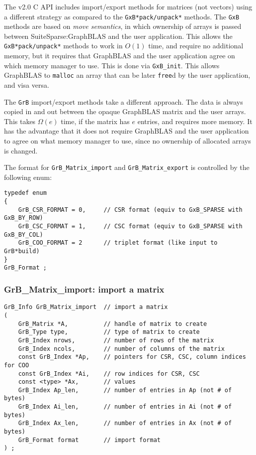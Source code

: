 \documentclass[12pt]{article}
\begin{document}
{The v2.0 C API includes import/export methods for matrices (not vectors) using
a different strategy as compared to the \verb'GxB*pack/unpack*' methods.  The
\verb'GxB' methods are based on {\em move semantics}, in which ownership of
arrays is passed between SuiteSparse:GraphBLAS and the user application.  This
allows the \verb'GxB*pack/unpack*' methods to work in $O(1)$ time, and require
no additional memory, but it requires that GraphBLAS and the user application
agree on which memory manager to use.  This is done via \verb'GxB_init'.  This
allows GraphBLAS to \verb'malloc' an array that can be later \verb'free'd by
the user application, and visa versa.

The \verb'GrB' import/export methods take a different approach.  The data
is always copied in and out between the opaque GraphBLAS matrix and the
user arrays.  This takes $\Omega(e)$ time, if the matrix has $e$ entries,
and requires more memory.  It has the advantage that it does not require
GraphBLAS and the user application to agree on what memory manager to use,
since no ownership of allocated arrays is changed.

The format for \verb'GrB_Matrix_import' and \verb'GrB_Matrix_export' is
controlled by the following enum:

{\footnotesize
\begin{verbatim}
typedef enum
{
    GrB_CSR_FORMAT = 0,     // CSR format (equiv to GxB_SPARSE with GxB_BY_ROW)
    GrB_CSC_FORMAT = 1,     // CSC format (equiv to GxB_SPARSE with GxB_BY_COL)
    GrB_COO_FORMAT = 2      // triplet format (like input to GrB*build)
}
GrB_Format ; \end{verbatim}}

\newpage
\subsubsection{{\sf GrB\_Matrix\_import:}  import a matrix}
\label{GrB_matrix_import}

\begin{mdframed}[userdefinedwidth=6in]
{\footnotesize
\begin{verbatim}
GrB_Info GrB_Matrix_import  // import a matrix
(
    GrB_Matrix *A,          // handle of matrix to create
    GrB_Type type,          // type of matrix to create
    GrB_Index nrows,        // number of rows of the matrix
    GrB_Index ncols,        // number of columns of the matrix
    const GrB_Index *Ap,    // pointers for CSR, CSC, column indices for COO
    const GrB_Index *Ai,    // row indices for CSR, CSC
    const <type> *Ax,       // values
    GrB_Index Ap_len,       // number of entries in Ap (not # of bytes)
    GrB_Index Ai_len,       // number of entries in Ai (not # of bytes)
    GrB_Index Ax_len,       // number of entries in Ax (not # of bytes)
    GrB_Format format       // import format
) ;
\end{verbatim}
} \end{mdframed}

}
\end{document}
